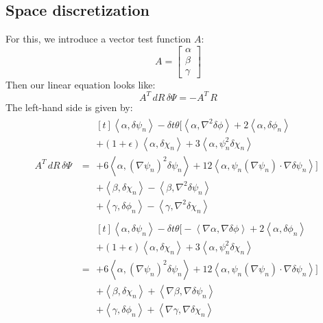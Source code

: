 \documentclass[reqno]{article}
\begin{document}
\subsection{Space discretization}
For this, we introduce a vector test function $A$:
\begin{equation}
    A
    =
    \begin{bmatrix}
        \alpha \\
        \beta \\
        \gamma
    \end{bmatrix}
\end{equation}
Then our linear equation looks like:
\begin{equation}
    A^T \, dR \, \delta \Psi
    =
    -A^T \, R
\end{equation}
The left-hand side is given by:
\begin{equation}
    \begin{split}
        A^T \, dR \, \delta \Psi
        &=
        \begin{multlined}[t]
            \left<\alpha, \delta \psi_n \right>
            - \delta t \theta \bigl[ \left< \alpha, \nabla^2 \delta \phi \right>
                + 2 \left< \alpha, \delta \phi_n \right> \\
                + \left(1 + \epsilon\right) \left< \alpha, \delta \chi_n \right>
                + 3 \left< \alpha, \psi_n^2 \delta \chi_n \right> \\
                + 6 \left<\alpha, \left(\nabla \psi_n\right)^2 \delta \psi_n \right>
                + 12 \left< \alpha, \psi_n \left(\nabla \psi_n \right) \cdot \nabla \delta \psi_n \right>
            \bigr] \\
            + \left< \beta, \delta \chi_n \right>
            - \left< \beta, \nabla^2 \delta \psi_n \right> \\
            + \left< \gamma, \delta \phi_n \right>
            - \left< \gamma, \nabla^2 \delta \chi_n \right>
        \end{multlined} \\
        &=
        \begin{multlined}[t]
            \left<\alpha, \delta \psi_n \right>
            - \delta t \theta \bigl[ -\left< \nabla \alpha, \nabla \delta \phi \right>
                + 2 \left< \alpha, \delta \phi_n \right> \\
                + \left(1 + \epsilon\right) \left< \alpha, \delta \chi_n \right>
                + 3 \left< \alpha, \psi_n^2 \delta \chi_n \right> \\
                + 6 \left<\alpha, \left(\nabla \psi_n\right)^2 \delta \psi_n \right>
                + 12 \left< \alpha, \psi_n \left(\nabla \psi_n \right) \cdot \nabla \delta \psi_n \right>
            \bigr] \\
            + \left< \beta, \delta \chi_n \right>
            + \left< \nabla \beta, \nabla \delta \psi_n \right> \\
            + \left< \gamma, \delta \phi_n \right>
            + \left< \nabla \gamma, \nabla \delta \chi_n \right>
        \end{multlined}
    \end{split}
\end{equation}
\end{document}
